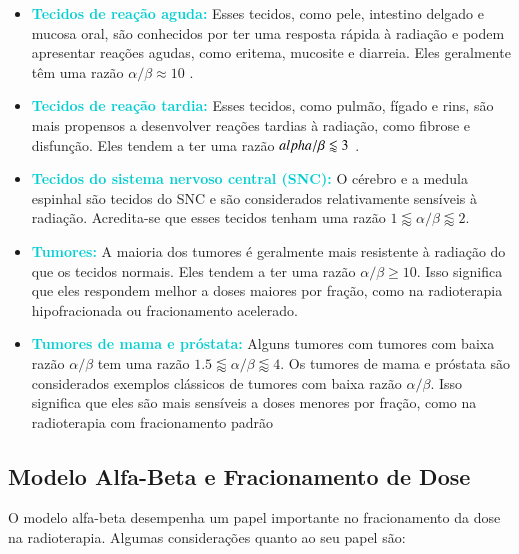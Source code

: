 \documentclass[11pt,a4paper]{article}
\newcounter{exemplo}
\begin{document}
	\begin{itemize}
		\item \textcolor{DarkTurquoise}{\textbf{Tecidos de reação aguda:}} Esses tecidos, como pele, intestino delgado e mucosa oral, são conhecidos por ter uma resposta rápida à radiação e podem apresentar reações agudas, como eritema, mucosite e diarreia. Eles geralmente têm uma razão $\alpha/\beta \approx 10$ .

		\item \textcolor{DarkTurquoise}{\textbf{Tecidos de reação tardia:}} Esses tecidos, como pulmão, fígado e rins, são mais propensos a desenvolver reações tardias à radiação, como fibrose e disfunção. Eles tendem a ter uma razão $\\alpha/\beta \lessapprox  3$ .

		\item \textcolor{DarkTurquoise}{\textbf{Tecidos do sistema nervoso central (SNC):}} O cérebro e a medula espinhal são tecidos do SNC e são considerados relativamente sensíveis à radiação. Acredita-se que esses tecidos tenham uma razão $1 \lessapprox \alpha/\beta \lessapprox 2$.

		\item \textcolor{DarkTurquoise}{\textbf{Tumores:}} A maioria dos tumores é geralmente mais resistente à radiação do que os tecidos normais. Eles tendem a ter uma razão $\alpha/\beta \geq 10 $. Isso significa que eles respondem melhor a doses maiores por fração, como na radioterapia hipofracionada ou fracionamento acelerado.

		\item \textcolor{DarkTurquoise}{\textbf{Tumores de mama e próstata:}} Alguns tumores com tumores com baixa razão $\alpha/\beta$ tem uma razão $1.5 \lessapprox \alpha/\beta \lessapprox 4$. Os tumores de mama e próstata são considerados exemplos clássicos de tumores com baixa razão $\alpha/\beta$. Isso significa que eles são mais sensíveis a doses menores por fração, como na radioterapia com fracionamento padrão
		
	\end{itemize}

\subsection*{Modelo Alfa-Beta e Fracionamento de Dose}

O modelo alfa-beta desempenha um papel importante no fracionamento da dose na radioterapia. Algumas considerações quanto ao seu papel são:
\end{document}
